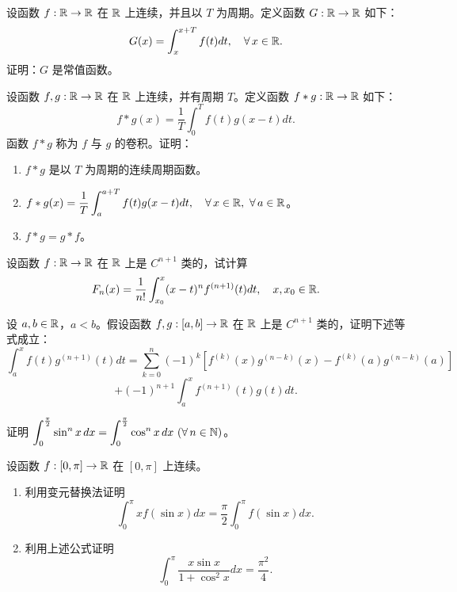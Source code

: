 \begin{exercise}
	\item 设函数 \(f:\mathbb{R}\to\mathbb{R}\) 在 \(\mathbb{R}\) 上连续，并且以 \(T\) 为周期。定义函数 \(G:\mathbb{R}\to\mathbb{R}\) 如下：
	\[
	G(x)=\int_x^{x+T}f(t)dt,\quad\forall\,x\in\mathbb{R}.
	\]
	证明：\(G\) 是常值函数。
\end{exercise}

\begin{exercise}
	\item 设函数 \(f,g:\mathbb{R}\to\mathbb{R}\) 在 \(\mathbb{R}\) 上连续，并有周期 \(T\)。定义函数 \(f*g:\mathbb{R}\to\mathbb{R}\) 如下：
	\[
	f*g(x)=\frac1T\int_0^T f(t)g(x-t)dt.
	\]
	函数 \(f*g\) 称为 \(f\) 与 \(g\) 的卷积。证明：
	\begin{enumerate}[label=\arabic*)]
		\item \(f*g\) 是以 \(T\) 为周期的连续周期函数。
		\item \(\displaystyle f*g(x)=\frac1T\int_a^{a+T}f(t)g(x-t)dt,\quad\forall\,x\in\R,\ \forall\,a\in\R\)。
		\item \(f*g=g*f\)。
	\end{enumerate}
\end{exercise}

\begin{exercise}
	\item 设函数 \(f:\mathbb{R}\to\mathbb{R}\) 在 \(\mathbb{R}\) 上是 \(C^{n+1}\) 类的，试计算
	\[
	F_n(x)=\frac1{n!}\int_{x_0}^x(x-t)^n f^{(n+1)}(t)dt,\quad x,x_0\in\mathbb{R}.
	\]
\end{exercise}

\begin{exercise}
	\item 设 \(a,b\in\mathbb{R}\)，\(a<b\)。假设函数 \(f,g:[a,b]\to\mathbb{R}\) 在 \(\mathbb{R}\) 上是 \(C^{n+1}\) 类的，证明下述等式成立：
	\[
	\int_a^x f(t)g^{(n+1)}(t)dt=\sum_{k=0}^n(-1)^k\left[f^{(k)}(x)g^{(n-k)}(x)-f^{(k)}(a)g^{(n-k)}(a)\right]
	\]
	\[
	+(-1)^{n+1}\int_a^x f^{(n+1)}(t)g(t)dt.
	\]
\end{exercise}

\begin{exercise}
	\item 证明 \(\displaystyle\int_0^{\frac\pi2}\sin^nx\,dx=\int_0^{\frac\pi2}\cos^nx\,dx\ (\forall\,n\in\N)\)。
\end{exercise}

\begin{exercise}
	\item 设函数 \(f:[0,\pi]\to\mathbb{R}\) 在 \([0,\pi]\) 上连续。
	\begin{enumerate}[label=\arabic*)]
		\item 利用变元替换法证明
		\[
		\int_0^\pi xf(\sin x)dx=\frac\pi2\int_0^\pi f(\sin x)dx.
		\]
		\item 利用上述公式证明
		\[
		\int_0^\pi\frac{x\sin x}{1+\cos^2x}dx=\frac{\pi^2}{4}.
		\]
	\end{enumerate}
\end{exercise}

